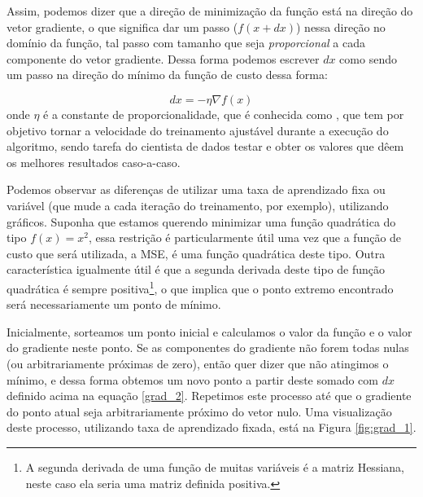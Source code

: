 Assim, podemos dizer que a direção de minimização da função está na direção do vetor gradiente, o que significa dar um passo ($f(x + dx)$) nessa direção no domínio da função, tal passo com tamanho que seja \emph{proporcional} a cada componente do vetor gradiente. Dessa forma podemos escrever $dx$ como sendo um passo na direção do mínimo da função de custo dessa forma:

\begin{equation}\label{grad_2}
dx = - \eta \nabla f(x)
\end{equation}
onde $\eta$ é a constante de proporcionalidade, que é conhecida como , que tem por objetivo tornar a velocidade do treinamento ajustável durante a execução do algoritmo, sendo tarefa do cientista de dados testar e obter os valores que dêem os melhores resultados caso-a-caso. 

Podemos observar as diferenças de utilizar uma taxa de aprendizado fixa ou variável (que mude a cada iteração do treinamento, por exemplo), utilizando gráficos. Suponha que estamos querendo minimizar uma função quadrática do tipo $f(x) = x^2$, essa restrição é particularmente útil uma vez que a função de custo que será utilizada, a MSE, é uma função quadrática deste tipo. Outra característica igualmente útil é que a segunda derivada deste tipo de função quadrática é sempre positiva\footnote{A segunda derivada de uma função de muitas variáveis é a matriz Hessiana, neste caso ela seria uma matriz definida positiva.}, o que implica que o ponto extremo encontrado será necessariamente um ponto de mínimo.

Inicialmente, sorteamos um ponto inicial e calculamos o valor da função e o valor do gradiente neste ponto. Se as componentes do gradiente não forem todas nulas (ou arbitrariamente próximas de zero), então quer dizer que não atingimos o mínimo, e dessa forma obtemos um novo ponto a partir deste somado com $dx$ definido acima na equação \ref{grad_2}. Repetimos este processo até que o gradiente do ponto atual seja arbitrariamente próximo do vetor nulo. Uma visualização deste processo, utilizando taxa de aprendizado fixada, está na Figura \ref{fig:grad_1}.

